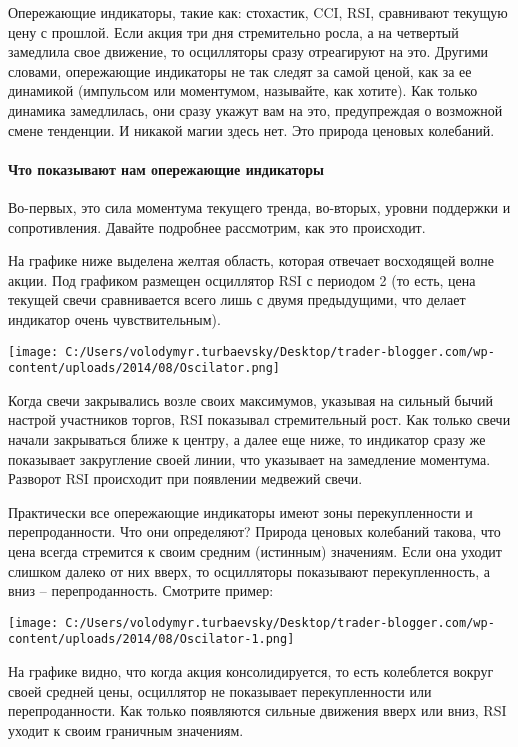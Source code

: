 \documentclass[a5paper]{article}
\begin{document}
Опережающие индикаторы, такие как: стохастик, CCI, RSI, сравнивают
текущую цену с прошлой. Если акция три дня стремительно росла, а на
четвертый замедлила свое движение, то осцилляторы сразу отреагируют на
это. Другими словами, опережающие индикаторы не так следят за самой
ценой, как за ее динамикой (импульсом или моментумом, называйте, как
хотите). Как только динамика замедлилась, они сразу укажут вам на это,
предупреждая о возможной смене тенденции. И никакой магии здесь
нет. Это природа ценовых колебаний.

\paragraph{Что показывают нам опережающие индикаторы}

Во-первых, это сила моментума текущего тренда, во-вторых, уровни поддержки и сопротивления. Давайте подробнее рассмотрим, как это происходит.

На графике ниже выделена желтая область, которая отвечает восходящей
волне акции. Под графиком размещен осциллятор RSI с периодом 2 (то
есть, цена текущей свечи сравнивается всего лишь с двумя предыдущими,
что делает индикатор очень чувствительным).

\texttt{[image: C:/Users/volodymyr.turbaevsky/Desktop/trader-blogger.com/wp-content/uploads/2014/08/Oscilator.png]}

Когда свечи закрывались возле своих максимумов, указывая на сильный бычий настрой участников торгов, RSI показывал стремительный рост. Как только свечи начали закрываться ближе к центру, а далее еще ниже, то индикатор сразу же показывает закругление своей линии, что указывает на замедление моментума. Разворот RSI происходит при появлении медвежий свечи.

Практически все опережающие индикаторы имеют зоны перекупленности и перепроданности. Что они определяют? Природа ценовых колебаний такова, что цена всегда стремится к своим средним (истинным) значениям. Если она уходит слишком далеко от них вверх, то осцилляторы показывают перекупленность, а вниз – перепроданность. Смотрите пример:

\texttt{[image: C:/Users/volodymyr.turbaevsky/Desktop/trader-blogger.com/wp-content/uploads/2014/08/Oscilator-1.png]}

На графике видно, что когда акция консолидируется, то есть колеблется вокруг своей средней цены, осциллятор не показывает перекупленности или перепроданности. Как только появляются сильные движения вверх или вниз, RSI уходит к своим граничным значениям.
\end{document}
